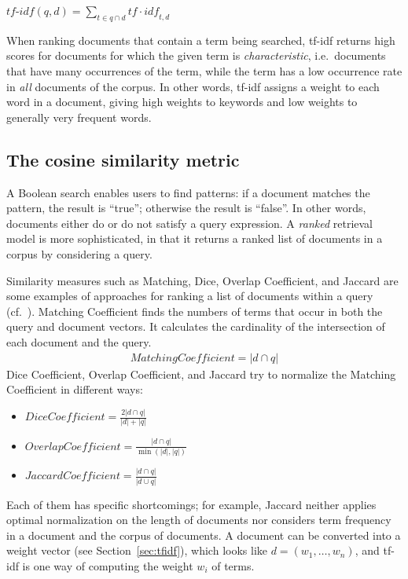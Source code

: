 \documentclass{IOS-Book-Article}
\begin{document}
\begin{center}
	$\textit{tf-idf}(q,d)=\sum_{t\in q\cap d} \mathit{tf}\cdot\mathit{idf}_{t,d}$
\end{center}

When ranking documents that contain a term being searched, tf-idf returns high scores for documents for which the given term is \emph{characteristic}, i.e.\ documents that have many occurrences of the term, while the term has a low occurrence rate in \emph{all} documents of the corpus.
In other words, tf-idf assigns a weight to each word in a document, giving high weights to keywords and low weights to generally very frequent words.

\subsection{The cosine similarity metric}
\label{sec:cosine}
A Boolean search enables users to find patterns: if a document matches the pattern, the result is “true”; otherwise the result is “false”.
In other words, documents either do or do not satisfy a query expression.
A \emph{ranked} retrieval model is more sophisticated, in that it returns a ranked list of documents in a corpus by considering a query. 

Similarity measures such as Matching, Dice, Overlap Coefficient, and Jaccard are some examples of approaches for ranking a list of documents within a query (cf.~\citet{ChristopherD1999}).
Matching Coefficient finds the numbers of terms that occur in both the query and document vectors.
It calculates the cardinality of the intersection of each document and the query.
\begin{align*}
\mathit{Matching Coefficient}=|d\cap q|
\end{align*}
Dice Coefficient, Overlap Coefficient, and Jaccard try to normalize the Matching Coefficient in different ways:
\begin{itemize}
	\item $\mathit{Dice Coefficient}=\frac{2|d\cap q|}{|d|+|q|}$
	\item $\mathit{Overlap Coefficient}=\frac{|d\cap q|}{\min(|d|,|q|)}$
	\item $\mathit{Jaccard Coefficient}=\frac{|d\cap q|}{|d\cup q|}$
\end{itemize}
Each of them has specific shortcomings;
for example, Jaccard neither applies optimal normalization on the length of documents nor considers term frequency in a document and the corpus of documents.
A document can be converted into a weight vector (see Section~\ref{sec:tfidf}), which looks like $d=(w_1,\dots,w_n)$, and tf-idf is one way of computing the weight $w_i$ of terms.
\end{document}
